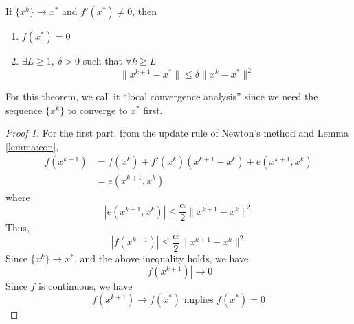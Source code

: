 \begin{theorem}
    If $\{x^k\} \to x^*$ and $f'(x^*) \neq 0$, then \begin{enumerate}
        \item $f(x^*) = 0$
        \item $\exists L \ge 1,\ \delta > 0$ such that $\forall k \ge L$ \[
            \|x^{k+1} - x^*\| \leq \delta \|x^k - x^*\|^2        
        \]
    \end{enumerate}
    \begin{note}
        For this theorem, we call it ``local convergence analysis'' since we need the sequence $\{x^k\}$ to converge to $x^*$ first.
    \end{note}
\end{theorem}
\begin{proof}[Proof 1]
    For the first part, from the update rule of Newton's method and Lemma \ref{lemma:con}, \begin{align*}
        f(x^{k+1}) &= f(x^k) + f'(x^k)(x^{k+1} - x^k) + e(x^{k+1}, x^k) \\
        &= e(x^{k+1}, x^k)
    \end{align*}
    where \[
        |e(x^{k+1}, x^k)| \leq \frac{\alpha}{2} \|x^{k+1} - x^k\|^2
    \]
    Thus, \[
        |f(x^{k+1})| \leq \frac{\alpha}{2} \|x^{k+1} - x^k\|^2
    \]
    Since $\{x^k\} \to x^*$, and the above inequality holds, we have \[
        |f(x^{k+1})| \to 0
    \]
    Since $f$ is continuous, we have \[
        f(x^{k+1}) \to f(x^*) \mbox{ implies } f(x^*) = 0
    \]
\end{proof}

